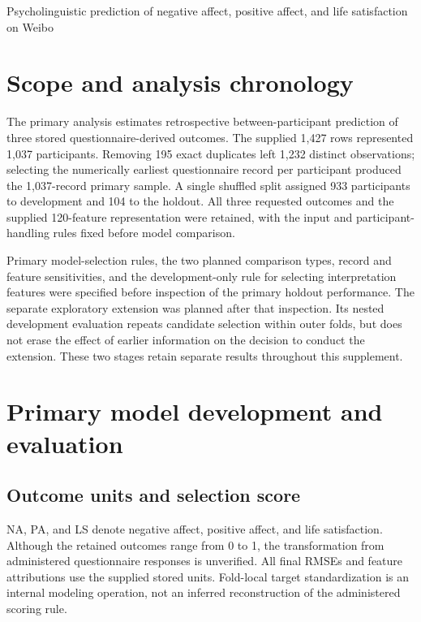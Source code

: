 
\renewcommand{\thetable}{S\arabic{table}}

\begin{center}Psycholinguistic prediction of negative affect, positive affect, and life satisfaction on Weibo\end{center}
\section{Scope and analysis chronology}
The primary analysis estimates retrospective between-participant prediction of three stored questionnaire-derived outcomes. The supplied 1,427 rows represented 1,037 participants. Removing 195 exact duplicates left 1,232 distinct observations; selecting the numerically earliest questionnaire record per participant produced the 1,037-record primary sample. A single shuffled split assigned 933 participants to development and 104 to the holdout. All three requested outcomes and the supplied 120-feature representation were retained, with the input and participant-handling rules fixed before model comparison.

Primary model-selection rules, the two planned comparison types, record and feature sensitivities, and the development-only rule for selecting interpretation features were specified before inspection of the primary holdout performance. The separate exploratory extension was planned after that inspection. Its nested development evaluation repeats candidate selection within outer folds, but does not erase the effect of earlier information on the decision to conduct the extension. These two stages retain separate results throughout this supplement.

\section{Primary model development and evaluation}
\subsection{Outcome units and selection score}
NA, PA, and LS denote negative affect, positive affect, and life satisfaction. Although the retained outcomes range from 0 to 1, the transformation from administered questionnaire responses is unverified. All final RMSEs and feature attributions use the supplied stored units. Fold-local target standardization is an internal modeling operation, not an inferred reconstruction of the administered scoring rule.


